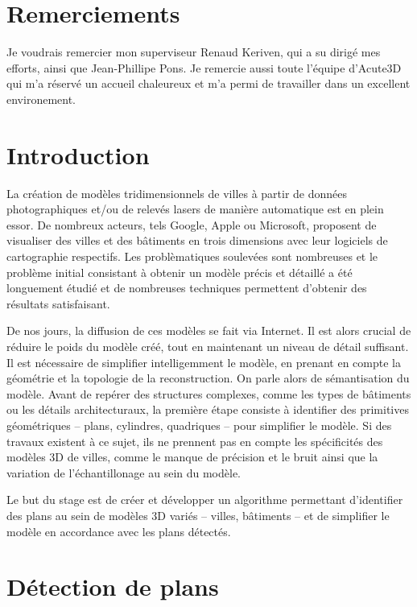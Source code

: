\documentclass[12pt, twoside]{article}
\let\oldsection\section
\def\section{\cleardoublepage\oldsection}
\begin{document}
\section*{Remerciements}
Je voudrais remercier mon superviseur Renaud Keriven, qui a su dirigé mes efforts, ainsi que Jean-Phillipe Pons. Je remercie aussi toute l'équipe d'Acute3D qui m'a réservé un accueil chaleureux et m'a permi de travailler dans un excellent environement.
\newpage

\tableofcontents
\newpage

\section*{Introduction}
La création de modèles tridimensionnels de villes à partir de données photographiques et/ou de relevés lasers de manière automatique est en plein essor. De nombreux acteurs, tels Google, Apple ou Microsoft, proposent de visualiser des villes et des bâtiments en trois dimensions avec leur logiciels de cartographie respectifs. Les problèmatiques soulevées sont nombreuses et le problème initial consistant à obtenir un modèle précis et détaillé a été longuement étudié et de nombreuses techniques permettent d'obtenir des résultats satisfaisant.

De nos jours, la diffusion de ces modèles se fait via Internet. Il est alors crucial de réduire le poids du modèle créé, tout en maintenant un niveau de détail suffisant. Il est nécessaire de simplifier intelligemment le modèle, en prenant en compte la géométrie et la topologie de la reconstruction. On parle alors de sémantisation du modèle. Avant de repérer des structures complexes, comme les types de bâtiments ou les détails architecturaux, la première étape consiste à identifier des primitives géométriques -- plans, cylindres, quadriques -- pour simplifier le modèle. Si des travaux existent à ce sujet, ils ne prennent pas en compte les spécificités des modèles 3D de villes, comme le manque de précision et le bruit ainsi que la variation de l'échantillonage au sein du modèle.

Le but du stage est de créer et développer un algorithme permettant d'identifier des plans au sein de modèles 3D variés -- villes, bâtiments -- et de simplifier le modèle en accordance avec les plans détectés.
\newpage

\section{Détection de plans}
\end{document}
